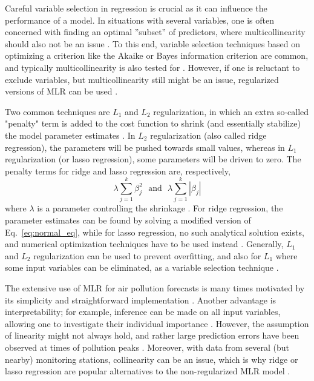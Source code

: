 Careful variable selection in regression is crucial as it can influence the performance of a model. In situations with several variables, one is often concerned with finding an optimal ”subset” of predictors, where multicollinearity should also not be an issue \cite{Montgomery2012}. To this end, variable selection techniques based on optimizing a criterion like the Akaike or Bayes information criterion are common, and typically multicollinearity is also tested for \cite{Montgomery2012}. However, if one is reluctant to exclude variables, but multicollinearity still might be an issue, regularized versions of MLR can be used \cite{Montgomery2012}. 

Two common techniques are $L_1$ and  $L_2$ regularization, in which an extra so-called "penalty" term is added to the cost function to shrink (and essentially stabilize) the model parameter estimates \cite{smlbook}. In $L_2$ regularization (also called ridge regression), the parameters will be pushed towards small values, whereas in $L_1$ regularization (or lasso regression), some parameters will be driven to zero. The penalty terms for ridge and lasso regression are, respectively, 
$$\lambda \sum_{j=1}^{k}\beta_{j}^2\:\:\: \text{and}\:\:\: \lambda \sum_{j=1}^{k}|\beta_{j}|$$
where $\lambda$ is a parameter controlling the shrinkage \cite{smlbook}. For ridge regression, the parameter estimates can be found by solving a modified version of Eq.\ \ref{eq:normal_eq}, while for lasso regression, no such analytical solution exists, and numerical optimization techniques have to be used instead \cite{smlbook}. Generally, $L_1$ and $L_2$ regularization can be used to prevent overfitting, and also for $L_1$ where some input variables can be eliminated, as a variable selection technique \cite{smlbook}. 

The extensive use of MLR for air pollution forecasts is many times motivated by its simplicity and straightforward implementation \cite{atmos7020015}. Another advantage is interpretability; for example, inference can be made on all input variables, allowing one to investigate their individual importance \cite{Montgomery2012}. However, the assumption of linearity might not always hold, and rather large prediction errors have been observed at times of pollution peaks \cite{atmos7020015}. Moreover, with data from several (but nearby) monitoring stations, collinearity can be an issue, which is why ridge or lasso regression are popular alternatives to the non-regularized MLR model \cite{atmos7020015, FaganeliPucer2018}. 

